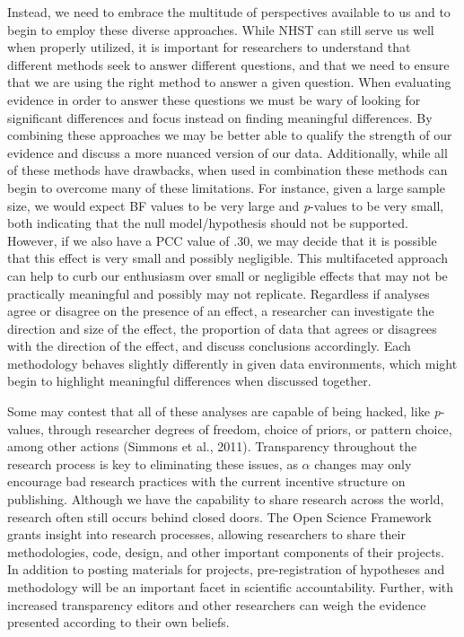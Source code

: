 \documentclass[,man, mask]{apa6}
\begin{document}
Instead, we need to embrace the multitude of perspectives available to us and to begin to employ these diverse approaches. While NHST can still serve us well when properly utilized, it is important for researchers to understand that different methods seek to answer different questions, and that we need to ensure that we are using the right method to answer a given question. When evaluating evidence in order to answer these questions we must be wary of looking for significant differences and focus instead on finding meaningful differences. By combining these approaches we may be better able to qualify the strength of our evidence and discuss a more nuanced version of our data. Additionally, while all of these methods have drawbacks, when used in combination these methods can begin to overcome many of these limitations. For instance, given a large sample size, we would expect BF values to be very large and \emph{p}-values to be very small, both indicating that the null model/hypothesis should not be supported. However, if we also have a PCC value of .30, we may decide that it is possible that this effect is very small and possibly negligible. This multifaceted approach can help to curb our enthusiasm over small or negligible effects that may not be practically meaningful and possibly may not replicate. Regardless if analyses agree or disagree on the presence of an effect, a researcher can investigate the direction and size of the effect, the proportion of data that agrees or disagrees with the direction of the effect, and discuss conclusions accordingly. Each methodology behaves slightly differently in given data environments, which might begin to highlight meaningful differences when discussed together.

Some may contest that all of these analyses are capable of being hacked, like \emph{p}-values, through researcher degrees of freedom, choice of priors, or pattern choice, among other actions (Simmons et al., 2011). Transparency throughout the research process is key to eliminating these issues, as \(\alpha\) changes may only encourage bad research practices with the current incentive structure on publishing. Although we have the capability to share research across the world, research often still occurs behind closed doors. The Open Science Framework grants insight into research processes, allowing researchers to share their methodologies, code, design, and other important components of their projects. In addition to posting materials for projects, pre-registration of hypotheses and methodology will be an important facet in scientific accountability. Further, with increased transparency editors and other researchers can weigh the evidence presented according to their own beliefs.
\end{document}
